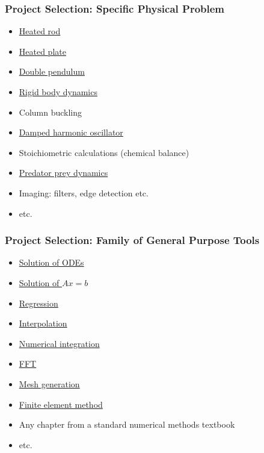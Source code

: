 \documentclass[t,12pt,numbers,fleqn]{beamer}
\begin{document}
\begin{frame}
\frametitle{Project Selection: Specific Physical Problem}
\begin{itemize}
\item
  \href{https://ocw.mit.edu/courses/mathematics/18-303-linear-partial-differential-equations-fall-2006/lecture-notes/heateqni.pdf}{
    Heated
    rod}
\item \href{http://www.tech.plym.ac.uk/sme/THER204B-web/Heatran2.PDF}{Heated plate}
\item \href{https://en.wikipedia.org/wiki/Double_pendulum}{Double pendulum}
\item \href{http://chrishecker.com/Rigid_Body_Dynamics}{Rigid body dynamics}
\item Column buckling
\item \href{https://en.wikipedia.org/wiki/Harmonic_oscillator}{Damped harmonic oscillator}
\item Stoichiometric calculations (chemical balance)
\item
  \href{http://www.tiem.utk.edu/~gross/bioed/bealsmodules/predator-prey.html}{Predator
    prey dynamics}
\item Imaging: filters, edge detection etc.
\item etc.
\end{itemize}

\end{frame}


\begin{frame}
\frametitle{Project Selection: Family of General Purpose Tools}
\begin{itemize}
\item \href{https://en.wikipedia.org/wiki/Numerical_methods_for_ordinary_differential_equations}{Solution of ODEs}
\item \href{https://en.wikibooks.org/wiki/Numerical_Methods/Solution_of_Linear_Equation_Systems}{Solution of $A x = b$}
\item \href{https://en.wikipedia.org/wiki/Linear_regression}{Regression}
\item \href{https://en.wikibooks.org/wiki/Introduction_to_Numerical_Methods/Interpolation}{Interpolation}
\item \href{https://en.wikipedia.org/wiki/Numerical_integration}{Numerical integration}
\item \href{https://en.wikipedia.org/wiki/Fast_Fourier_transform}{FFT}
\item \href{https://en.wikipedia.org/wiki/Mesh_generation}{Mesh generation}
\item \href{https://en.wikipedia.org/wiki/Finite_element_method}{Finite element method}
\item Any chapter from a standard numerical methods textbook
\item etc.
\end{itemize}
\end{frame}
\end{document}
